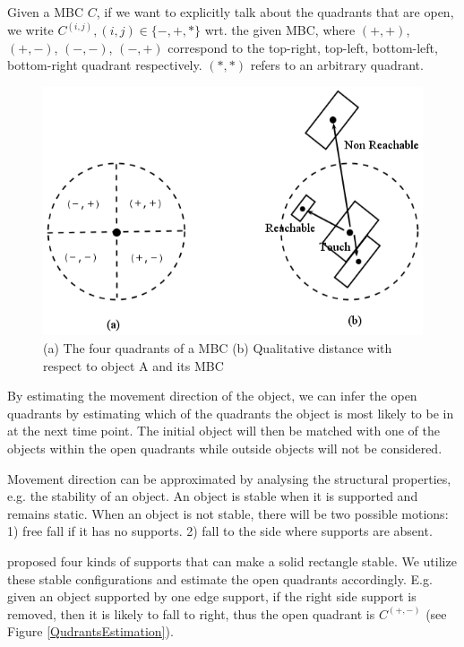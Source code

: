 \documentclass[letterpaper]{article}
\begin{document}
 Given a MBC $C$, if we want to explicitly talk about the quadrants that are open, we write $C^{(i,j)}, (i,j) \in \{-, +, *\}$ wrt. the given MBC, where $(+,+)$, $(+,-)$, $(-,-)$, $(-,+)$ correspond to the top-right, top-left, bottom-left, bottom-right quadrant respectively. $(*, *)$ refers to an arbitrary quadrant. 
\begin{figure}[h!]
\centering\includegraphics[scale=0.3]{quadrants.png}\caption{(a) The four quadrants of a MBC (b) Qualitative distance with respect to object A and its MBC}
\end{figure}
By estimating the movement direction of the object, we can infer the open quadrants by estimating which of the quadrants the object is most likely to be in at the next time point. The initial object will then be matched with one of the objects within the open quadrants while outside objects will not be considered.

Movement direction can be approximated by analysing the structural properties, e.g. the stability of an object. An object is stable when it is supported and remains static. When an object is not stable, there will be two possible motions: 1) free fall if it has no supports. 2) fall to the side where supports are absent. 

\cite{Ge2013} proposed four kinds of supports that can make a solid rectangle stable. We utilize these stable configurations and estimate the open quadrants accordingly. E.g. given an object supported by one edge support, if the right side support is removed, then it is likely to fall to right, thus the open quadrant is $C^{(+,-)}$
(see Figure \ref{QudrantsEstimation}). 
\end{document}
